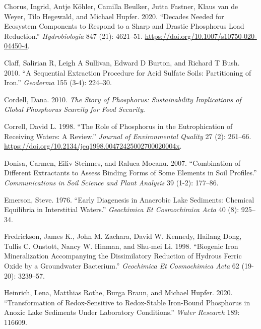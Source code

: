 \documentclass[a4paper,11pt]{article}
\newenvironment{CSLReferences}%
  {}%
  {\par}
\begin{document}
\begin{CSLReferences}{1}{0}
\leavevmode\hypertarget{ref-chorusDecadesNeededEcosystem2020}{}%
Chorus, Ingrid, Antje Köhler, Camilla Beulker, Jutta Fastner, Klaus van de Weyer, Tilo Hegewald, and Michael Hupfer. 2020. {``Decades Needed for Ecosystem Components to Respond to a Sharp and Drastic Phosphorus Load Reduction.''} \emph{Hydrobiologia} 847 (21): 4621--51. \url{https://doi.org/10.1007/s10750-020-04450-4}.

\leavevmode\hypertarget{ref-claffSequentialExtractionProcedure2010}{}%
Claff, Salirian R, Leigh A Sullivan, Edward D Burton, and Richard T Bush. 2010. {``A Sequential Extraction Procedure for Acid Sulfate Soils: Partitioning of Iron.''} \emph{Geoderma} 155 (3-4): 224--30.

\leavevmode\hypertarget{ref-cordell2010}{}%
Cordell, Dana. 2010. \emph{The Story of Phosphorus: Sustainability Implications of Global Phosphorus Scarcity for Food Security}.

\leavevmode\hypertarget{ref-correllRolePhosphorusEutrophication1998}{}%
Correll, David L. 1998. {``The {Role} of {Phosphorus} in the {Eutrophication} of {Receiving Waters}: {A Review}.''} \emph{Journal of Environmental Quality} 27 (2): 261--66. \url{https://doi.org/10.2134/jeq1998.00472425002700020004x}.

\leavevmode\hypertarget{ref-donisaCombinationDiferrentExtractants2007}{}%
Donisa, Carmen, Eiliv Steinnes, and Raluca Mocanu. 2007. {``Combination of Different Extractants to Assess Binding Forms of Some Elements in Soil Profiles.''} \emph{Communications in Soil Science and Plant Analysis} 39 (1-2): 177--86.

\leavevmode\hypertarget{ref-emersonEarlyDiagenesisAnaerobic1976}{}%
Emerson, Steve. 1976. {``Early Diagenesis in Anaerobic Lake Sediments: Chemical Equilibria in Interstitial Waters.''} \emph{Geochimica Et Cosmochimica Acta} 40 (8): 925--34.

\leavevmode\hypertarget{ref-fredricksonBiogenicIronMineralization1998}{}%
Fredrickson, James K., John M. Zachara, David W. Kennedy, Hailang Dong, Tullis C. Onstott, Nancy W. Hinman, and Shu-mei Li. 1998. {``Biogenic Iron Mineralization Accompanying the Dissimilatory Reduction of Hydrous Ferric Oxide by a Groundwater Bacterium.''} \emph{Geochimica Et Cosmochimica Acta} 62 (19-20): 3239--57.

\leavevmode\hypertarget{ref-heinrichTransformationRedoxsensitiveRedoxstable2020}{}%
Heinrich, Lena, Matthias Rothe, Burga Braun, and Michael Hupfer. 2020. {``Transformation of Redox-Sensitive to Redox-Stable Iron-Bound Phosphorus in Anoxic Lake Sediments Under Laboratory Conditions.''} \emph{Water Research} 189: 116609.


\end{CSLReferences}
\end{document}

